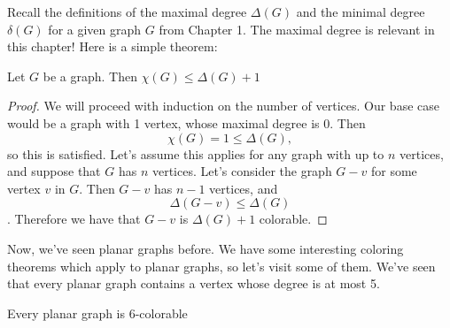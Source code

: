 Recall the definitions of the maximal degree $\Delta(G)$ and the minimal degree $\delta(G)$ for a given graph $G$ from Chapter 1. The maximal degree is relevant in this chapter! Here is a simple theorem:

\begin{theorem}
    Let $G$ be a graph. Then $\chi(G) \leq \Delta(G) + 1$
\end{theorem}
\begin{proof}
    We will proceed with induction on the number of vertices. Our base case would be a graph with 1 vertex, whose maximal degree is 0. Then\[\chi(G) = 1 \leq \Delta(G),\] so this is satisfied. Let's assume this applies for any graph with up to $n$ vertices, and suppose that $G$ has $n$ vertices. Let's consider the graph $G-v$ for some vertex $v$ in $G$. Then $G-v$ has $n-1$ vertices, and
    \[ \Delta(G-v) \leq \Delta(G) \].
    Therefore we have that $G-v$ is $\Delta(G) + 1$ colorable.
\end{proof}

Now, we've seen planar graphs before. We have some interesting coloring theorems which apply to planar graphs, so let's visit some of them. We've seen that every planar graph contains a vertex whose degree is at most 5.

\begin{theorem}
    Every planar graph is 6-colorable
\end{theorem}
